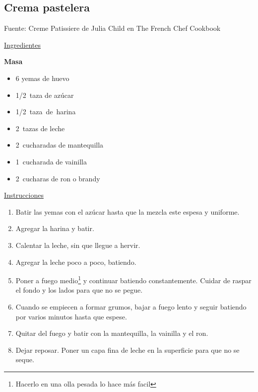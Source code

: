 \subsection{Crema pastelera}

Fuente: Creme Patissiere de Julia Child en The French Chef Cookbook

\underline{Ingredientes}

\textbf{Masa}
\begin{itemize}
\item 6 yemas de huevo
\item \SI{1/2}{taza} de azúcar
\item \SI{1/2}{taza de harina}
\item \SI{2}{tazas} de leche
\item \SI{2}{cucharadas} de mantequilla
\item \SI{1}{cucharada} de vainilla
\item \SI{2}{cucharas} de ron o brandy
\end{itemize}

\underline{Instrucciones}
\begin{enumerate}
\item Batir las yemas con el azúcar hasta que la mezcla este espesa y uniforme.
\item Agregar la harina y batir.
\item Calentar la leche, sin que llegue a hervir.
\item Agregar la leche poco a poco, batiendo.
\item Poner a fuego medio\footnote{Hacerlo en una olla pesada lo hace más facil} y continuar batiendo constantemente. Cuidar de raspar el fondo y los lados para que no se pegue.
\item Cuando se empiecen a formar grumos, bajar a fuego lento y seguir batiendo por varios minutos hasta que espese.
\item Quitar del fuego y batir con la mantequilla, la vainilla y el ron.
\item Dejar reposar. Poner un capa fina de leche en la superficie para que no se seque.
\end{enumerate}
